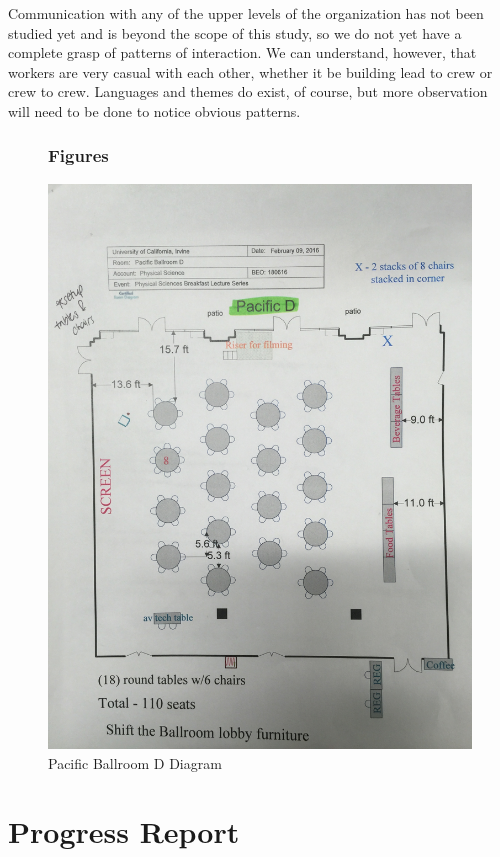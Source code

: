 \documentclass[letterpaper, 12pt]{report}
\begin{document}
Communication with any of the upper levels of the organization has not been studied yet and is beyond the scope of this study, so we do not yet have a complete grasp of patterns of interaction. We can understand, however, that workers are very casual with each other, whether it be building lead to crew or crew to crew. Languages and themes do exist, of course, but more observation will need to be done to notice obvious patterns.

\begin{figure}
	\section{Figures}
	\centering
	\includegraphics[width=15cm]{diagram.jpg}
	\caption{Pacific Ballroom D Diagram}
	\label{fig:ballroom1}
\end{figure}


\part{Progress Report}
\end{document}

